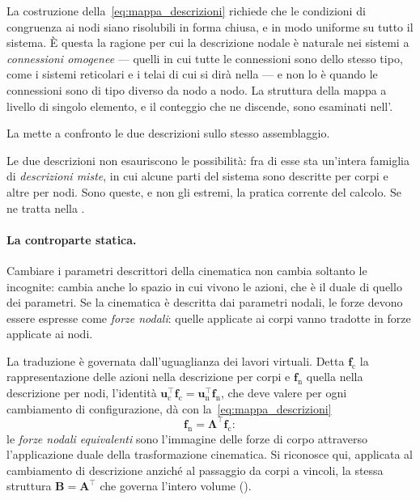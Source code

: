 La costruzione della~\eqref{eq:mappa_descrizioni} richiede
che le condizioni di congruenza ai nodi siano risolubili in
forma chiusa, e in modo uniforme su tutto il sistema. È
questa la ragione per cui la descrizione nodale è naturale
nei sistemi a \emph{connessioni omogenee} --- quelli in cui
tutte le connessioni sono dello stesso tipo, come i sistemi
reticolari e i telai di cui si dirà nella
 --- e non lo è quando le connessioni
sono di tipo diverso da nodo a nodo.
La struttura della mappa a livello di singolo elemento,
	e il conteggio che ne discende, sono esaminati
	nell'.


	La  mette a confronto le due
descrizioni sullo stesso assemblaggio.






\begin{oss}
	Le due descrizioni non esauriscono le possibilità: fra
	di esse sta un'intera famiglia di \emph{descrizioni miste},
	in cui alcune parti del sistema sono descritte per corpi
	e altre per nodi. Sono queste, e non gli estremi, la
	pratica corrente del calcolo. Se ne tratta nella
	.
\end{oss}


\paragraph{La controparte statica.}
Cambiare i parametri descrittori della cinematica non
cambia soltanto le incognite: cambia anche lo spazio in cui
vivono le azioni, che è il duale di quello dei parametri.
Se la cinematica è descritta dai parametri nodali, le forze
devono essere espresse come \emph{forze nodali}: quelle
applicate ai corpi vanno tradotte in forze applicate ai nodi.

La traduzione è governata dall'uguaglianza dei lavori
virtuali. Detta $\bm{f}_{\mathrm{c}}$ la rappresentazione
delle azioni nella descrizione per corpi e
$\bm{f}_{\mathrm{n}}$ quella nella descrizione per nodi,
l'identità $\bm{u}_{\mathrm{c}}^{\top}\bm{f}_{\mathrm{c}}
= \bm{u}_{\mathrm{n}}^{\top}\bm{f}_{\mathrm{n}}$, che deve
valere per ogni cambiamento di configurazione, dà con
la~\eqref{eq:mappa_descrizioni}
\begin{equation}\label{eq:forze_nodali_equiv}
	\bm{f}_{\mathrm{n}} = \bm{\Lambda}^{\top}\bm{f}_{\mathrm{c}} :
\end{equation}
le \emph{forze nodali equivalenti} sono l'immagine delle
forze di corpo attraverso l'applicazione duale della
trasformazione cinematica. Si riconosce qui, applicata al
cambiamento di descrizione anziché al passaggio da corpi a
vincoli, la stessa struttura $\bm{B} = \bm{A}^{\top}$ che
governa l'intero volume ().

